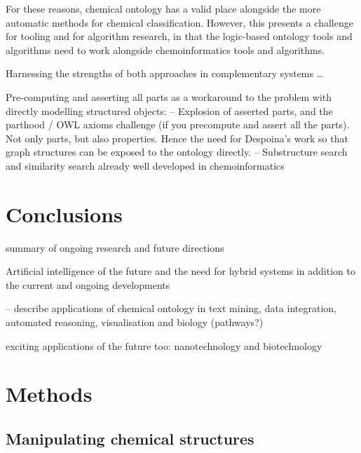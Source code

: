 \documentclass[10pt]{bmc_article}
\newenvironment{bmcformat}{\baselineskip20pt\sloppy\setboolean{publ}{false}}{\baselineskip20pt\sloppy}
\begin{document}
\begin{bmcformat}
For these reasons, chemical ontology has a valid place alongside the more automatic methods for chemical classification.  However, this presents a challenge for tooling and for algorithm research, in that the logic-based ontology tools and algorithms need to work alongside chemoinformatics tools and algorithms. 


Harnessing the strengths of both approaches in complementary systems \ldots




Pre-computing and asserting all parts as a workaround to the problem with directly modelling structured objects: 
-- Explosion of asserted parts, and the parthood / OWL axioms challenge (if you precompute and assert all the parts). Not only parts, but also properties. Hence the need for Despoina's work so that graph structures can be exposed to the ontology directly. 
-- Substructure search and similarity search already well developed in chemoinformatics 





\section*{Conclusions}

summary of ongoing research and future directions

Artificial intelligence of the future and the need for hybrid systems in addition to the current and ongoing developments 


-- describe applications of chemical ontology in text mining, data integration, automated reasoning, visualisation and biology (pathways?)

exciting applications of the future too: nanotechnology and biotechnology 



\section*{Methods}

\subsection*{Manipulating chemical structures}


\end{bmcformat}
\end{document}
